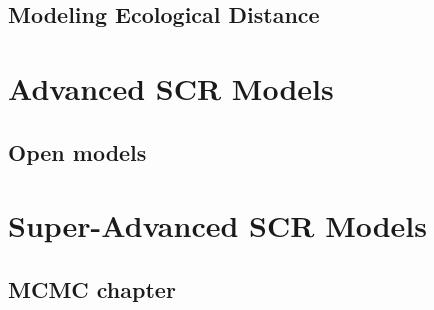 \documentclass{book}
\begin{document}
\chapter{Modeling Ecological Distance}
\label{chapt.ecoldist}

%


\part{Advanced SCR Models}





\chapter{Open models}
\label{chapt.open}


\part{Super-Advanced SCR Models}

\chapter{MCMC chapter}
\label{chapt.mcmc}

%

%









\end{document}
